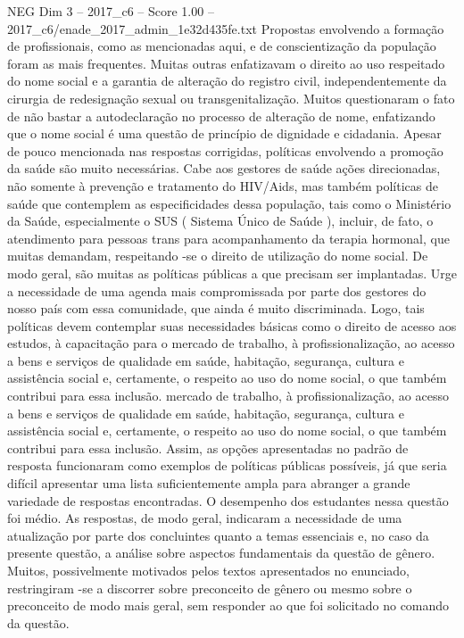 \begin{textsample}{NEG Dim 3 – 2017\_c6 – Score 1.00 – 2017\_c6/enade\_2017\_admin\_1e32d435fe.txt}
Propostas envolvendo a formação de profissionais, como as mencionadas aqui, e de conscientização da população foram as mais frequentes.
Muitas outras enfatizavam o direito ao uso respeitado do nome social e a garantia de alteração do registro civil, independentemente da cirurgia de redesignação sexual ou transgenitalização.
Muitos questionaram o fato de não bastar a autodeclaração no processo de alteração de nome, enfatizando que o nome social é uma questão de princípio de dignidade e cidadania.
Apesar de pouco mencionada nas respostas corrigidas, políticas envolvendo a promoção da saúde são muito necessárias.
Cabe aos gestores de saúde ações direcionadas, não somente à prevenção e tratamento do HIV/Aids, mas também políticas de saúde que contemplem as especificidades dessa população, tais como o Ministério da Saúde, especialmente o SUS ( Sistema Único de Saúde ), incluir, de fato, o atendimento para pessoas trans para acompanhamento da terapia hormonal, que muitas demandam, respeitando -se o direito de utilização do nome social.
De modo geral, são muitas as políticas públicas a que precisam ser implantadas.
Urge a necessidade de uma agenda mais compromissada por parte dos gestores do nosso país com essa comunidade, que ainda é muito discriminada.
Logo, tais políticas devem contemplar suas necessidades básicas como o direito de acesso aos estudos, à capacitação para o mercado de trabalho, à profissionalização, ao acesso a bens e serviços de qualidade em saúde, habitação, segurança, cultura e assistência social e, certamente, o respeito ao uso do nome social, o que também contribui para essa inclusão. mercado de trabalho, à profissionalização, ao acesso a bens e serviços de qualidade em saúde, habitação, segurança, cultura e assistência social e, certamente, o respeito ao uso do nome social, o que também contribui para essa inclusão.
Assim, as opções apresentadas no padrão de resposta funcionaram como exemplos de políticas públicas possíveis, já que seria difícil apresentar uma lista suficientemente ampla para abranger a grande variedade de respostas encontradas.
O desempenho dos estudantes nessa questão foi médio.
As respostas, de modo geral, indicaram a necessidade de uma atualização por parte dos concluintes quanto a temas essenciais e, no caso da presente questão, a análise sobre aspectos fundamentais da questão de gênero.
Muitos, possivelmente motivados pelos textos apresentados no enunciado, restringiram -se a discorrer sobre preconceito de gênero ou mesmo sobre o preconceito de modo mais geral, sem responder ao que foi solicitado no comando da questão.

\end{textsample}
